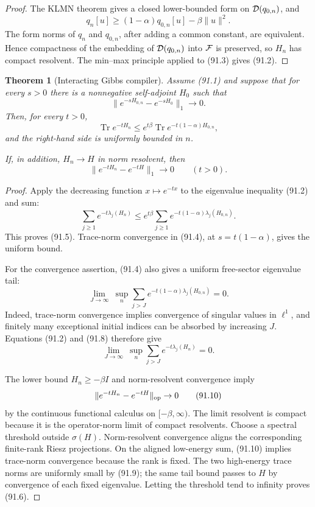 \documentclass[11pt]{article}
\newtheorem{theorem}{Theorem}[section]
\theoremstyle{remark}
\begin{document}
\begin{proof}
The KLMN theorem gives a closed lower-bounded form on
\({\cal D}(q_{0,n})\), and
\[
 q_n[u]\geq(1-\alpha)q_{0,n}[u]-\beta\|u\|^2.          \tag{91.3}
\]
The form norms of \(q_n\) and \(q_{0,n}\), after adding a common
constant, are equivalent.  Hence compactness of the embedding of
\({\cal D}(q_{0,n})\) into \({\cal F}\) is preserved, so \(H_n\)
has compact resolvent.  The min--max principle applied to (91.3)
gives (91.2).
\end{proof}

\begin{theorem}[Interacting Gibbs compiler]
\label{thm:v15v91-gibbs}
Assume (91.1) and suppose that for every \(s>0\) there is a
nonnegative self-adjoint \(H_0\) such that
\[
 \|e^{-sH_{0,n}}-e^{-sH_0}\|_1\longrightarrow0.        \tag{91.4}
\]
Then, for every \(t>0\),
\[
 \operatorname{Tr}e^{-tH_n}
 \leq e^{t\beta}
       \operatorname{Tr}e^{-t(1-\alpha)H_{0,n}},       \tag{91.5}
\]
and the right-hand side is uniformly bounded in \(n\).

If, in addition, \(H_n\to H\) in norm resolvent, then
\[
 \|e^{-tH_n}-e^{-tH}\|_1\longrightarrow0
 \qquad(t>0).                                         \tag{91.6}
\]
\end{theorem}

\begin{proof}
Apply the decreasing function \(x\mapsto e^{-tx}\) to the
eigenvalue inequality (91.2) and sum:
\[
 \sum_{j\geq1}e^{-t\lambda_j(H_n)}
 \leq e^{t\beta}\sum_{j\geq1}
       e^{-t(1-\alpha)\lambda_j(H_{0,n})}.             \tag{91.7}
\]
This proves (91.5).  Trace-norm convergence in (91.4), at
\(s=t(1-\alpha)\), gives the uniform bound.

For the convergence assertion, (91.4) also gives a uniform
free-sector eigenvalue tail:
\[
 \lim_{J\to\infty}\ \sup_n
 \sum_{j>J}e^{-t(1-\alpha)\lambda_j(H_{0,n})}=0.        \tag{91.8}
\]
Indeed, trace-norm convergence implies convergence of singular
values in \(\ell^1\), and finitely many exceptional initial indices
can be absorbed by increasing \(J\).  Equations (91.2) and (91.8)
therefore give
\[
 \lim_{J\to\infty}\ \sup_n
 \sum_{j>J}e^{-t\lambda_j(H_n)}=0.                     \tag{91.9}
\]

The lower bound \(H_n\geq-\beta I\) and norm-resolvent convergence
imply
\[
 \|e^{-tH_n}-e^{-tH}\|_{\rm op}\to0                   \tag{91.10}
\]
by the continuous functional calculus on \([-\beta,\infty)\).
The limit resolvent is compact because it is the operator-norm
limit of compact resolvents.  Choose a spectral threshold outside
\(\sigma(H)\).  Norm-resolvent convergence aligns the corresponding
finite-rank Riesz projections.  On the aligned low-energy sum,
(91.10) implies trace-norm convergence because the rank is fixed.
The two high-energy trace norms are uniformly small by (91.9);
the same tail bound passes to \(H\) by convergence of each fixed
eigenvalue.  Letting the threshold tend to infinity proves (91.6).
\end{proof}
\end{document}
